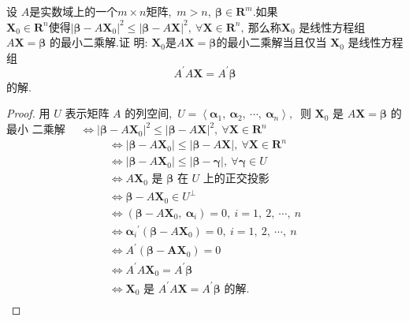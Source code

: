 \newpage
\begin{problem}
	设 $ A  $是实数域上的一个$  m \times n  $矩阵,\  $ m>n,\  \boldsymbol{\beta} \in \mathbf{R}^{m} .$如果 $ \boldsymbol{X}_{0} \in \mathbf{R}^{n}  使得  \left|\boldsymbol{\beta}-A \boldsymbol{X}_{0}\right|^{2} \leqslant|\boldsymbol{\beta}-A \boldsymbol{X}|^{2},\  \forall \boldsymbol{X} \in \mathbf{R}^{n} ,\  $那么称$  \boldsymbol{X}_{0} $ 是线性方程组$  A \boldsymbol{X}=\boldsymbol{\beta} $ 的最小二乘解.证 明: $ \boldsymbol{X}_{0}  是  A \boldsymbol{X}=\boldsymbol{\beta}  $的最小二乘解当且仅当 $ \boldsymbol{X}_{0} $ 是线性方程组
	$$A^{\prime} A \boldsymbol{X}=A^{\prime} \boldsymbol{\beta}$$
	的解.
\end{problem}
\begin{proof}
	用  $U $ 表示矩阵 $ A $ 的列空间,\  $ U=\left\langle\boldsymbol{\alpha}_{1},\  \boldsymbol{\alpha}_{2},\  \cdots,\  \boldsymbol{\alpha}_{n}\right\rangle ,\ $ 则 $ \boldsymbol{X}_{0} $ 是 $ A \boldsymbol{X}=\boldsymbol{\beta} $ 的最小 二乘解 $ \quad \Longleftrightarrow\left|\boldsymbol{\beta}-A \boldsymbol{X}_{0}\right|^{2} \leqslant|\boldsymbol{\beta}-A \boldsymbol{X}|^{2},\  \forall \boldsymbol{X} \in \mathbf{R}^{n} $
	$$\begin{array}{l}
		\Longleftrightarrow\left|\boldsymbol{\beta}-A \boldsymbol{X}_{0}\right| \leqslant|\boldsymbol{\beta}-A \boldsymbol{X}|,\  \forall \boldsymbol{X} \in \mathbf{R}^{n} \\
		\Longleftrightarrow\left|\boldsymbol{\beta}-A \boldsymbol{X}_{0}\right| \leqslant|\boldsymbol{\beta}-\boldsymbol{\gamma}|,\  \forall \boldsymbol{\gamma} \in U \\
		\Longleftrightarrow A \boldsymbol{X}_{0} \text { 是 } \boldsymbol{\beta} \text { 在 } U \text { 上的正交投影 } \\
		\Longleftrightarrow \boldsymbol{\beta}-A \mathbf{X}_{0} \in U^{\perp} \\
		\Longleftrightarrow\left(\boldsymbol{\beta}-A \boldsymbol{X}_{0},\  \boldsymbol{\alpha}_{i}\right)=0,\  i=1,\ 2,\  \cdots,\  n \\
		\Longleftrightarrow \boldsymbol{\alpha}_{i}{ }^{\prime}\left(\boldsymbol{\beta}-A \boldsymbol{X}_{0}\right)=0,\  i=1,\ 2,\  \cdots,\  n \\
		\Longleftrightarrow A^{\prime}\left(\boldsymbol{\beta}-\boldsymbol{A} \mathbf{X}_{0}\right)=0 \\
		\Longleftrightarrow A^{\prime} A \boldsymbol{X}_{0}=A^{\prime} \boldsymbol{\beta} \\
		\Longleftrightarrow \boldsymbol{X}_{0} \text { 是 } A^{\prime} A \boldsymbol{X}=A^{\prime} \boldsymbol{\beta} \text { 的解. } \\
	\end{array}$$
\end{proof}
